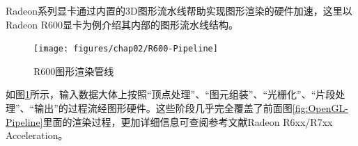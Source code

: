 Radeon系列显卡通过内置的3D图形流水线帮助实现图形渲染的硬件加速，这里以Radeon R600显卡为例介绍其内部的图形流水线结构。

\begin{figure}[H] 
  \centering
  \texttt{[image: figures/chap02/R600-Pipeline]}
  \caption{R600图形渲染管线}
  \label{fig:R600-Pipeline}
\end{figure}

如图\ref{fig:R600-Pipeline}所示，输入数据大体上按照“顶点处理”、“图元组装”、“光栅化”、“片段处理”、“输出”的过程流经图形硬件。这些阶段几乎完全覆盖了前面图\ref{fig:OpenGL-Pipeline}里面的渲染过程，更加详细信息可查阅参考文献Radeon R6xx/R7xx Acceleration\cite{Radeon-Manual}。
